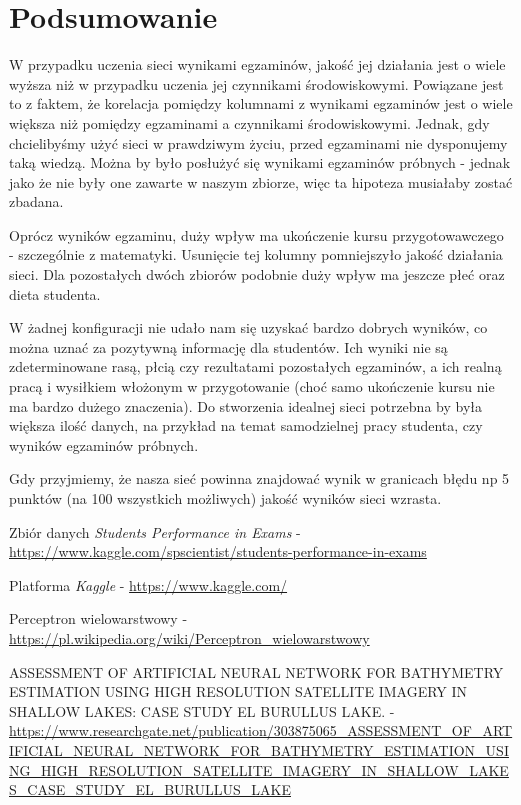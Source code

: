 \documentclass[12pt]{article}
\begin{document}
\pagebreak
\section{Podsumowanie}


W przypadku uczenia sieci wynikami egzaminów, jakość jej działania jest o wiele wyższa niż w przypadku uczenia jej czynnikami środowiskowymi. Powiązane jest to z faktem, że korelacja pomiędzy kolumnami z wynikami egzaminów jest o wiele większa niż pomiędzy egzaminami a czynnikami środowiskowymi. Jednak, gdy chcielibyśmy użyć sieci w prawdziwym życiu, przed egzaminami nie dysponujemy taką wiedzą. Można by było posłużyć się wynikami egzaminów próbnych - jednak jako że nie były one zawarte w naszym zbiorze, więc ta hipoteza musiałaby zostać zbadana.

Oprócz wyników egzaminu, duży wpływ ma ukończenie kursu przygotowawczego - szczególnie z matematyki. Usunięcie tej kolumny pomniejszyło jakość działania sieci. Dla pozostałych dwóch zbiorów podobnie duży wpływ ma jeszcze płeć oraz dieta studenta.

W żadnej konfiguracji nie udało nam się uzyskać bardzo dobrych wyników, co można uznać za pozytywną informację dla studentów. Ich wyniki nie są zdeterminowane rasą, płcią czy rezultatami pozostałych egzaminów, a ich realną pracą i wysiłkiem włożonym w przygotowanie (choć samo ukończenie kursu nie ma bardzo dużego znaczenia). Do stworzenia idealnej sieci potrzebna by była większa ilość danych, na przykład na temat samodzielnej pracy studenta, czy wyników egzaminów próbnych. 

Gdy przyjmiemy, że nasza sieć powinna znajdować wynik w granicach błędu np 5 punktów (na 100 wszystkich możliwych) jakość wyników sieci wzrasta. 

\pagebreak

\begin{thebibliography}{9}

Zbiór danych  \textit{Students Performance in Exams} - \url{https://www.kaggle.com/spscientist/students-performance-in-exams}

Platforma \textit{Kaggle} - \url{https://www.kaggle.com/}

Perceptron wielowarstwowy - \url{https://pl.wikipedia.org/wiki/Perceptron_wielowarstwowy}

ASSESSMENT OF ARTIFICIAL NEURAL NETWORK FOR BATHYMETRY ESTIMATION USING HIGH RESOLUTION SATELLITE IMAGERY IN SHALLOW LAKES: CASE STUDY EL BURULLUS LAKE. - \url{https://www.researchgate.net/publication/303875065_ASSESSMENT_OF_ARTIFICIAL_NEURAL_NETWORK_FOR_BATHYMETRY_ESTIMATION_USING_HIGH_RESOLUTION_SATELLITE_IMAGERY_IN_SHALLOW_LAKES_CASE_STUDY_EL_BURULLUS_LAKE}

\end{thebibliography}
\end{document}
